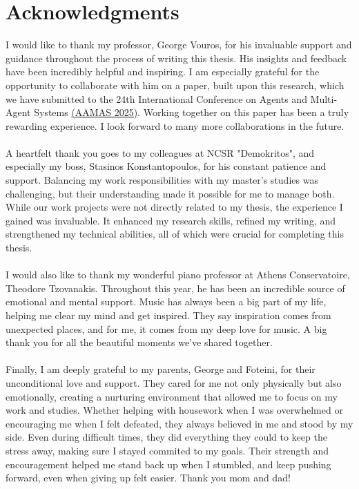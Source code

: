 \section*{Acknowledgments}

\begin{flushleft}
    I would like to thank my professor, George Vouros, for his invaluable support and guidance throughout the process of writing this thesis. His insights and feedback have been incredibly helpful and inspiring. I am especially grateful for the opportunity to collaborate with him on a paper, built upon this research, which we have submitted to the 24th International Conference on Agents and Multi-Agent Systems \href{https://aamas2025.org/}{(AAMAS 2025)}. Working together on this paper has been a truly rewarding experience. I look forward to many more collaborations in the future. \\~\\

    A heartfelt thank you goes to my colleagues at NCSR "Demokritos", and especially my boss, Stasinos Konstantopoulos, for his constant patience and support. Balancing my work responsibilities with my master’s studies was challenging, but their understanding made it possible for me to manage both. While our work projects were not directly related to my thesis, the experience I gained was invaluable. It enhanced my research skills, refined my writing, and strengthened my technical abilities, all of which were crucial for completing this thesis. \\~\\

    I would also like to thank my wonderful piano professor at Athens Conservatoire, Theodore Tzovanakis. Throughout this year, he has been an incredible source of emotional and mental support. Music has always been a big part of my life, helping me clear my mind and get inspired. They say inspiration comes from unexpected places, and for me, it comes from my deep love for music. A big thank you for all the beautiful moments we've shared together. \\~\\

    Finally, I am deeply grateful to my parents, George and Foteini, for their unconditional love and support. They cared for me not only physically but also emotionally, creating a nurturing environment that allowed me to focus on my work and studies. Whether helping with housework when I was overwhelmed or encouraging me when I felt defeated, they always believed in me and stood by my side. Even during difficult times, they did everything they could to keep the stress away, making sure I stayed commited to my goals. Their strength and encouragement helped me stand back up when I stumbled, and keep pushing forward, even when giving up felt easier. Thank you mom and dad!
\end{flushleft}

